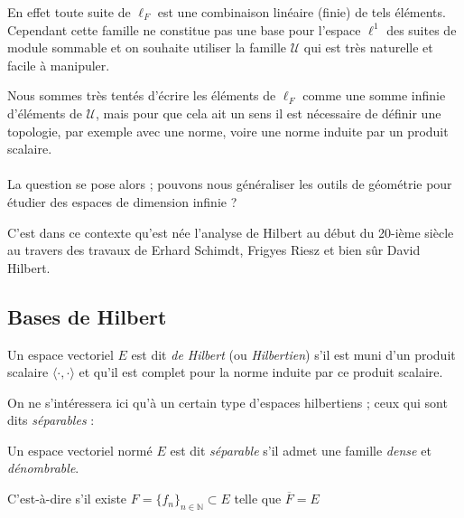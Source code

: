 	En effet toute suite de $\ell_F$ est une combinaison linéaire (finie) de tels éléments. Cependant cette famille ne constitue pas une base pour l'espace $\ell^1$ des suites de module sommable et on souhaite utiliser la famille $\mathcal{U}$ qui est très naturelle et facile à manipuler.
	
	Nous sommes très tentés d'écrire les éléments de $\ell_F$ comme une somme infinie d'éléments de $\mathcal{U}$, mais pour que cela ait un sens il est nécessaire de définir une topologie, par exemple avec une norme, voire une norme induite par un produit scalaire.
	
	\paragraph*{}
	
	La question se pose alors ; pouvons nous généraliser les outils de géométrie pour étudier des espaces de dimension infinie ?
	
	C'est dans ce contexte qu'est née l'analyse de Hilbert au début du 20-ième siècle au travers des travaux de Erhard Schimdt, Frigyes Riesz et bien sûr David Hilbert.
	
	\subsection{Bases de Hilbert}
	
	\begin{mydef}
		Un espace vectoriel $E$ est dit \textit{de Hilbert} (ou \textit{Hilbertien}) s'il est muni d'un produit scalaire $\langle \cdot, \cdot \rangle$ et qu'il est complet pour la norme induite par ce produit scalaire.
	\end{mydef}
	
	On ne s'intéressera ici qu'à un certain type d'espaces hilbertiens ; ceux qui sont dits \textit{séparables} :
	
	\begin{mydef}
		Un espace vectoriel normé $E$ est dit \textit{séparable} s'il admet une famille \textit{dense} et \textit{dénombrable}.
		
		C'est-à-dire s'il existe $F = \{f_n\}_{n \in \mathbb{N}} \subset E$ telle que $\overline{F} = E$
	\end{mydef}
	
